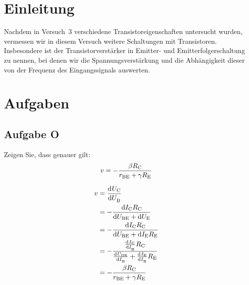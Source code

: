 \newpage
\tableofcontents

\listoftodo
\newpage


\FloatBarrier
\section{Einleitung}

Nachdem in Versuch~3 verschiedene Transistoreigenschaften untersucht wurden,
vermessen wir in diesem Versuch weitere Schaltungen mit Transistoren.
Insbesondere ist der Transistorverstärker in Emitter- und
Emitterfolgerschaltung zu nennen, bei denen wir die Spannungsverstärkung und
die Abhängigkeit dieser von der Frequenz des Eingangssignals auswerten.


\FloatBarrier
\section{Aufgaben}

\FloatBarrier
\subsection{Aufgabe O}

\begin{problem}
    Zeigen Sie, dass genauer gilt:
    \begin{equation}
        \label{eq:3_4-14}
        v = - \frac{\beta R_\text{C}}{r_\text{BE} + \gamma R_\text{E}}
    \end{equation}
\end{problem}

\begin{align*}
    v &= \dod \UC\UB\\
      &= -\frac{\dif\IC\RC}{\dif\UBE + \dif\UE}\\
      &= -\frac{\dif\IC\RC}{\dif\UBE + \dif\IE\RE}\\
      &= -\frac{\od\IC\IB\RC}{\od\UBE\IB+\od\IE\IB\RE}\\
      &= -\frac{\beta\RC}{r_\text{BE}+\gamma\RE}
\end{align*}

